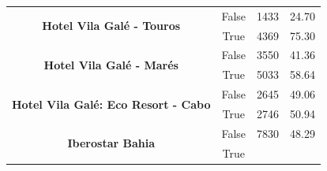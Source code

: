 \begin{table}[]
\begin{tabular}{|c|c|r|r|}
		\multirow{2}{*}{\textbf{Hotel Vila Galé - Touros}}                      &
		False                                                                   &
		1433                                                                    &
		24.70                                                                     \\ \cline{2-4}
		                                                                        &
		True                                                                    &
		4369                                                                    &
		75.30                                                                     \\ \hline
		\multirow{2}{*}{\textbf{Hotel Vila Galé - Marés}}                       &
		False                                                                   &
		3550                                                                    &
		41.36                                                                     \\ \cline{2-4}
		                                                                        &
		True                                                                    &
		5033                                                                    &
		58.64                                                                     \\ \hline
		\multirow{2}{*}{\textbf{Hotel Vila Galé: Eco Resort - Cabo}}            &
		False                                                                   &
		2645                                                                    &
		49.06                                                                     \\ \cline{2-4}
		                                                                        &
		True                                                                    &
		2746                                                                    &
		50.94                                                                     \\ \hline
		\multirow{2}{*}{\textbf{Iberostar Bahia}}                               &
		False                                                                   &
		7830                                                                    &
		48.29                                                                     \\ \cline{2-4}
		                                                                        &
		True                                                                    &

\end{tabular}
\end{table}
